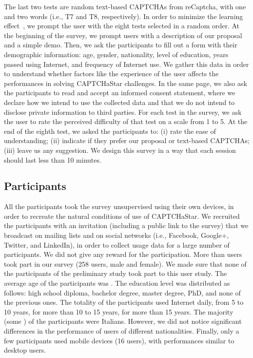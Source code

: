 \documentclass[conference]{IEEEtran}
\newcommand{\hilight}[1]{#1}
\begin{document}
The last two tests are \hilight{random} text-based CAPTCHAs from reCaptcha, with one and two words (i.e., T7 and T8, respectively). 
In order to minimize the learning effect~\cite{kosara2003user}, we prompt the user with the eight tests selected in a random order.
At the beginning of the survey, we prompt users with a description of our proposal and a simple demo.
Then, we ask the participants to fill out a form with their demographic information: age, gender, nationality, level of education, years passed using Internet, and frequency of Internet use. 
We gather this data in order to understand whether factors like the experience of the user affects the performances in solving CAPTCHaStar challenges.
In the same page, we also ask the participants to read and accept an informed consent statement, where we declare how we intend to use the collected data and that we do not intend to disclose private information to third parties.
\hilight{For each test in the survey, we ask the user to rate the perceived difficulty of that test on a scale from 1 to 5.}
At the end of the eighth test, we asked the participants to: (i) rate the ease of understanding; (ii) indicate if they prefer our proposal or text-based CAPTCHAs; (iii) leave us any suggestion.
We design this survey in a way that each session should last less than 10 minutes. \subsection{Participants}
All the participants took the survey unsupervised using their own devices, in order to recreate the natural conditions of use of CAPTCHaStar.
We recruited the participants with an invitation (including a public link to the survey) that we broadcast on mailing lists and on social networks (i.e., Facebook, Google+, Twitter, and LinkedIn), in order to collect usage data for a large number of participants.
We did not give any reward for the participation.
More than  users took part in our survey (\hilight{258 users, } male and  female). 
We made sure that none of the  participants of the preliminary study took part to this user study.
The average age of the participants was . The education level was distributed as follows:  high school diploma,  bachelor degree,  master degree,  PhD, and  none of the previous ones.
The totality of the participants used Internet daily,   from 5 to 10 years,  for more than 10 to 15 years,  for more than 15 years.
The majority (some ) of the participants were Italians. \hilight{However, we did not notice significant differences in the performance of users of different nationalities}. 
\hilight{Finally, only a few participants used mobile devices (16 users), with performances similar to desktop users.}
\end{document}
